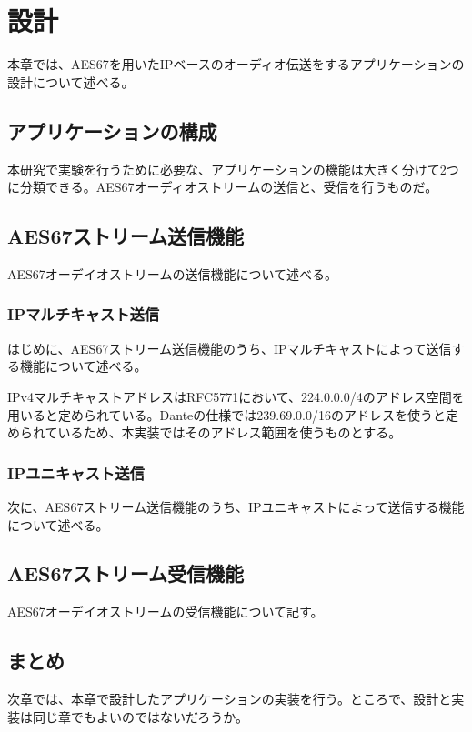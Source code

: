 \chapter{設計}
\label{chap:design}

本章では、AES67を用いたIPベースのオーディオ伝送をするアプリケーションの設計について述べる。

\section{アプリケーションの構成}

本研究で実験を行うために必要な、アプリケーションの機能は大きく分けて2つに分類できる。AES67オーディオストリームの送信と、受信を行うものだ。

\section{AES67ストリーム送信機能}

AES67オーデイオストリームの送信機能について述べる。

\subsection{IPマルチキャスト送信}

はじめに、AES67ストリーム送信機能のうち、IPマルチキャストによって送信する機能について述べる。

IPv4マルチキャストアドレスはRFC5771\cite{rfc5771}において、224.0.0.0/4のアドレス空間を用いると定められている。Danteの仕様では239.69.0.0/16のアドレスを使うと定められているため、本実装ではそのアドレス範囲を使うものとする。

\subsection{IPユニキャスト送信}

次に、AES67ストリーム送信機能のうち、IPユニキャストによって送信する機能について述べる。

\section{AES67ストリーム受信機能}

AES67オーデイオストリームの受信機能について記す。

\section{まとめ}

次章では、本章で設計したアプリケーションの実装を行う。ところで、設計と実装は同じ章でもよいのではないだろうか。
